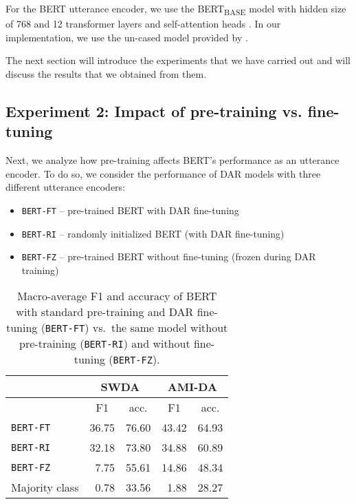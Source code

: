 \documentclass[11pt,a4paper]{article}
\begin{document}
For the BERT utterance encoder, we use the BERT\textsubscript{BASE} model with hidden size of 768 and 12 transformer layers and self-attention heads \citep[][\S3.1]{devlinBERTPretrainingDeep2018}.
In our implementation, we use the un-cased model provided by \citet{wolfHuggingFaceTransformersStateoftheart2019}.

The next section will introduce the experiments that we have carried out and will discuss the results that we obtained from them.

\subsection{Experiment 2: Impact of pre-training vs. fine-tuning} \label{sec:experiment2} %
Next, we analyze how pre-training affects BERT's performance as an utterance encoder.
To do so, we consider the performance of DAR models with three different utterance encoders:
\begin{itemize}
  \item \texttt{BERT-FT} -- pre-trained BERT with DAR fine-tuning 
  \item \texttt{BERT-RI} -- randomly initialized BERT (with DAR fine-tuning)
  \item \texttt{BERT-FZ} -- pre-trained BERT without fine-tuning (frozen during DAR training)
\end{itemize}

\begin{table}[]
\centering
\begin{tabular}{@{}lrrrr@{}}
\toprule
                           & \multicolumn{2}{c}{SWDA}                          & \multicolumn{2}{c}{AMI-DA}                        \\ \midrule
                           & \multicolumn{1}{c}{F1} & \multicolumn{1}{c}{acc.} & \multicolumn{1}{c}{F1} & \multicolumn{1}{c}{acc.} \\
\texttt{BERT-FT} & 36.75           & 76.60                    & 43.42                  & 64.93                    \\
\texttt{BERT-RI} & 32.18           & 73.80                    & 34.88                  & 60.89                    \\
\texttt{BERT-FZ} & 7.75            & 55.61                    & 14.86                  & 48.34 \\ \midrule
    Majority class    & 0.78  & 33.56 &  1.88 & 28.27      \\ \bottomrule
\end{tabular}
  \caption{Macro-average F1 and accuracy of BERT with standard pre-training and DAR fine-tuning (\texttt{BERT-FT}) vs.~the same model without pre-training (\texttt{BERT-RI}) and without fine-tuning (\texttt{BERT-FZ}).}
  \label{table:exp2}
\end{table}
\end{document}
